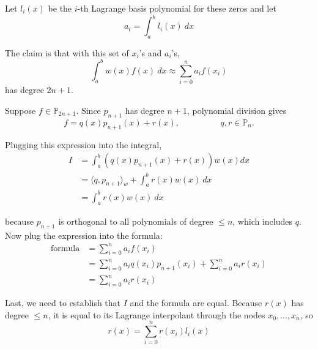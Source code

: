\documentclass[a4paper,11pt]{report}
\begin{document}
\begin{enumerate}
\begin{itemize}
    Let $l_{i} (x)$ be the $i$-th Lagrange basis polynomial for these zeros 
    and let
    \begin{equation*}
    a_{i} = \int_{a}^{b} l_{i} (x)\ dx
    \end{equation*}    

    The claim is that with this set of $x_{i}$'s and $a_{i}$'s, 
    \begin{equation*}
    \int_{a}^{b} w(x) f(x)\ dx \approx \sum_{i=0}^{n} a_{i} f(x_{i})
    \end{equation*}
    has degree $2n+1$. 

    Suppose $f \in \mathbb{P}_{2n+1}$. Since $p_{n+1}$ has degree $n+1$, 
    polynomial division gives
    \begin{equation*}
    f = q(x)p_{n+1} (x) + r(x), \hspace{2cm} q, r \in \mathbb{P}_{n}.
    \end{equation*}

    Plugging this expression into the integral,
    \begin{equation*}
    \begin{aligned}
    I &= \int_{a}^{b} (q(x)p_{n+1}(x) + r(x)) w(x) dx \\
      &= \langle q, p_{n+1} \rangle_{w} + \int_{a}^{b} r(x) w(x)\ dx \\
      &= \int_{a}^{b} r(x) w(x)\ dx
    \end{aligned}
    \end{equation*}

    because $p_{n+1}$ is orthogonal to all polynomials of degree $\le n$, 
    which includes $q$. Now plug the expression into the formula:
    \begin{equation*}
    \begin{aligned}
    \text{formula} &= \sum_{i=0}^{n} a_{i} f(x_{i}) \\
    &= \sum_{i=0}^{n} a_{i} q(x_{i}) p_{n+1}(x_{i}) + \sum_{i=0}^{n} a_{i} 
    r(x_{i}) \\
    &= \sum_{i=0}^{n} a_{i} r(x_{i})
    \end{aligned}
    \end{equation*}
 
    Last, we need to establish that $I$ and the formula are equal. Because 
    $r(x)$ has degree $\le n$, it is equal to its Lagrange interpolant through
    the nodes $x_{0},...,x_{n}$, so
    \begin{equation*}
    r(x) = \sum_{i=0}^{n} r(x_{i}) l_{i}(x)
    \end{equation*}


\end{itemize}
\end{enumerate}
\end{document}

